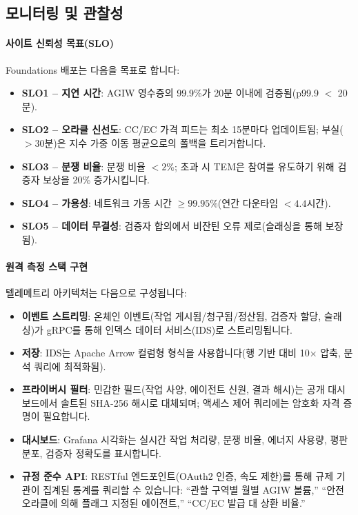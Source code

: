 \documentclass[11pt]{article}
\begin{document}
\subsection{모니터링 및 관찰성}
\paragraph{사이트 신뢰성 목표(SLO)} Foundations 배포는 다음을 목표로 합니다:
\begin{itemize}[noitemsep]
  \item \textbf{SLO1 -- 지연 시간}: AGIW 영수증의 99.9\%가 20분 이내에 검증됨(p99.9 $<$ 20분).
  \item \textbf{SLO2 -- 오라클 신선도}: CC/EC 가격 피드는 최소 15분마다 업데이트됨; 부실($>30$분)은 지수 가중 이동 평균으로의 폴백을 트리거합니다.
  \item \textbf{SLO3 -- 분쟁 비율}: 분쟁 비율 $<2\%$; 초과 시 TEM은 참여를 유도하기 위해 검증자 보상을 20\% 증가시킵니다.
  \item \textbf{SLO4 -- 가용성}: 네트워크 가동 시간 $\geq 99.95\%$(연간 다운타임 $<4.4$시간).
  \item \textbf{SLO5 -- 데이터 무결성}: 검증자 합의에서 비잔틴 오류 제로(슬래싱을 통해 보장됨).
\end{itemize}

\paragraph{원격 측정 스택 구현} 텔레메트리 아키텍처는 다음으로 구성됩니다:
\begin{itemize}[noitemsep]
  \item \textbf{이벤트 스트리밍}: 온체인 이벤트(작업 게시됨/청구됨/정산됨, 검증자 할당, 슬래싱)가 gRPC를 통해 인덱스 데이터 서비스(IDS)로 스트리밍됩니다.
  \item \textbf{저장}: IDS는 Apache Arrow 컬럼형 형식을 사용합니다(행 기반 대비 10$\times$ 압축, 분석 쿼리에 최적화됨).
  \item \textbf{프라이버시 필터}: 민감한 필드(작업 사양, 에이전트 신원, 결과 해시)는 공개 대시보드에서 솔트된 SHA-256 해시로 대체되며; 액세스 제어 쿼리에는 암호화 자격 증명이 필요합니다.
  \item \textbf{대시보드}: Grafana 시각화는 실시간 작업 처리량, 분쟁 비율, 에너지 사용량, 평판 분포, 검증자 정확도를 표시합니다.
  \item \textbf{규정 준수 API}: RESTful 엔드포인트(OAuth2 인증, 속도 제한)를 통해 규제 기관이 집계된 통계를 쿼리할 수 있습니다: ``관할 구역별 월별 AGIW 볼륨,'' ``안전 오라클에 의해 플래그 지정된 에이전트,'' ``CC/EC 발급 대 상환 비율.''
\end{itemize}
\end{document}
